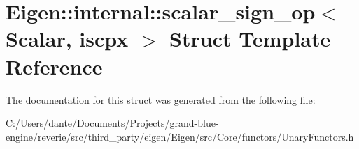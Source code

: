 \hypertarget{struct_eigen_1_1internal_1_1scalar__sign__op}{}\section{Eigen\+::internal\+::scalar\+\_\+sign\+\_\+op$<$ Scalar, iscpx $>$ Struct Template Reference}
\label{struct_eigen_1_1internal_1_1scalar__sign__op}


The documentation for this struct was generated from the following file\+:\begin{DoxyCompactItemize}
\item 
C\+:/\+Users/dante/\+Documents/\+Projects/grand-\/blue-\/engine/reverie/src/third\+\_\+party/eigen/\+Eigen/src/\+Core/functors/Unary\+Functors.\+h\end{DoxyCompactItemize}
